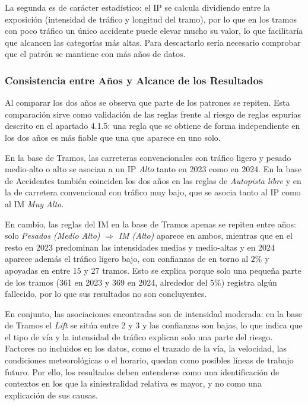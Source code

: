 \documentclass[twoside,a4paper,12pt,onecolumn,openany]{book}
\begin{document}
\vspace{0.5cm}

La segunda es de carácter estadístico: el IP se calcula dividiendo entre la exposición (intensidad de tráfico y longitud del tramo), por lo que en los tramos con poco tráfico un único accidente puede elevar mucho su valor, lo que facilitaría que alcancen las categorías más altas. Para descartarlo sería necesario comprobar que el patrón se mantiene con más años de datos.

\subsubsection{Consistencia entre Años y Alcance de los Resultados}

Al comparar los dos años se observa que parte de los patrones se repiten. Esta comparación sirve como validación de las reglas frente al riesgo de reglas espurias descrito en el apartado 4.1.5: una regla que se obtiene de forma independiente en los dos años es más fiable que una que aparece en uno solo. 

\vspace{0.5cm}

En la base de Tramos, las carreteras convencionales con tráfico ligero y pesado medio-alto o alto se asocian a un IP \textit{Alto} tanto en 2023 como en 2024. En la base de Accidentes también coinciden los dos años en las reglas de \textit{Autopista libre} y en la de carretera convencional con tráfico muy bajo, que se asocia tanto al IP como al IM \textit{Muy Alto}. 

\vspace{0.5cm}

En cambio, las reglas del IM en la base de Tramos apenas se repiten entre años: solo \textit{Pesados (Medio Alto)} $\Rightarrow$ \textit{IM (Alto)} aparece en ambos, mientras que en el resto en 2023 predominan las intensidades medias y medio-altas y en 2024 aparece además el tráfico ligero bajo, con confianzas de en torno al $2\%$ y apoyadas en entre 15 y 27 tramos. Esto se explica porque solo una pequeña parte de los tramos (361 en 2023 y 369 en 2024, alrededor del $5\%$) registra algún fallecido, por lo que sus resultados no son concluyentes.

\vspace{0.5cm}

En conjunto, las asociaciones encontradas son de intensidad moderada: en la base de Tramos el \textit{Lift} se sitúa entre 2 y 3 y las confianzas son bajas, lo que indica que el tipo de vía y la intensidad de tráfico explican solo una parte del riesgo. Factores no incluidos en los datos, como el trazado de la vía, la velocidad, las condiciones meteorológicas o el horario, quedan como posibles líneas de trabajo futuro. Por ello, los resultados deben entenderse como una identificación de contextos en los que la siniestralidad relativa es mayor, y no como una explicación de sus causas.
\end{document}
